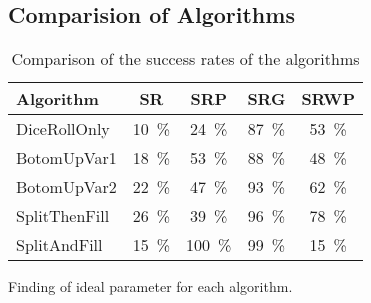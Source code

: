 \noindent
{}
\\


\pagebreak
\subsection{Comparision of Algorithms}

\begin{table}[H]
	\centering
	\begin{tabular}{ | l | c |c |c |c | }
		\hline
Algorithm 		& SR 	& SRP 	& SRG 	& SRWP   	\\ \hline
\hline
DiceRollOnly 	& 10~\%	& 24~\% & 87~\% & 53~\%		\\ \hline
BotomUpVar1 	& 18~\% & 53~\% & 88~\% & 48~\% 	\\ \hline
BotomUpVar2 	& 22~\% & 47~\% & 93~\% & 62~\% 	\\ \hline
SplitThenFill 	& 26~\% & 39~\% & 96~\% & 78~\% 	\\ \hline
SplitAndFill 	& 15~\% & 100~\% & 99~\% & 15~\% 	\\ \hline
	\end{tabular}
	\caption{Comparison of the success rates of the algorithms}
	\label{comparisonAlgorithms}
\end{table}
Finding of ideal parameter for each algorithm.
\pagebreak